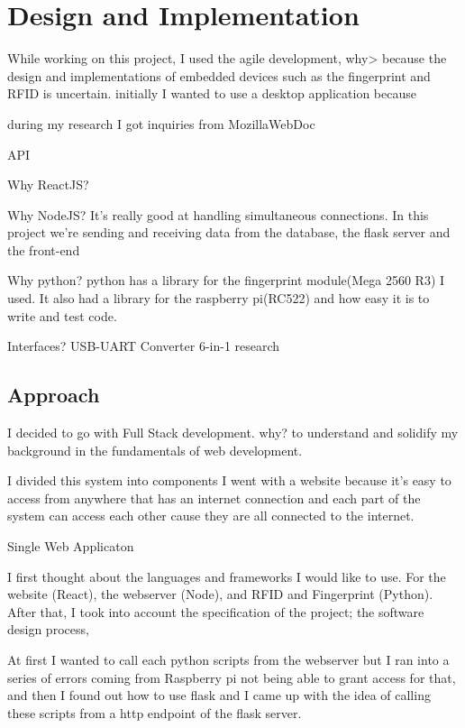 \chapter{Design and Implementation}
While working on this project, I used the agile development, why> because the design and implementations of embedded devices such as the fingerprint and RFID is uncertain.  initially I wanted to use a desktop application because 

during my research I got inquiries from MozillaWebDoc

API


Why ReactJS?

Why NodeJS?
It's really good at handling simultaneous connections. In this project we're sending and receiving data from the database, the flask server and the front-end

Why python?
python has a library for the fingerprint module(Mega 2560 R3) I used. It also had a library for the raspberry pi(RC522) and how easy it is to write and test code.

Interfaces?
USB-UART Converter 6-in-1 research

\section{Approach}

I decided to go with Full Stack development. why? to understand and solidify my background in the fundamentals of web development. 

I divided this system into components 
I went with a website because it's easy to access from anywhere that has an internet connection and each part of the system can access each other cause they are all connected to the internet. 

Single Web Applicaton

I first thought about the languages and frameworks I would like to use. For the website (React), the webserver (Node), and RFID and Fingerprint (Python). After that, I took into account the specification of the project; the software design process, 

At first I wanted to call each python scripts from the webserver but I ran into a series of errors coming from Raspberry pi not being able to grant access for that, and then I found out how to use flask and I came up with the idea of calling these scripts from a http endpoint of the flask server.